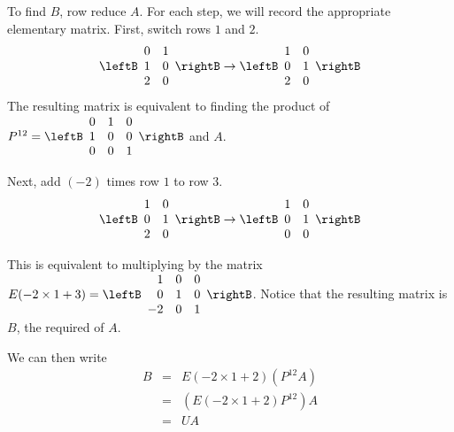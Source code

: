\begin{solution}
To find $B$, row reduce $A$. For each step, we will record the appropriate elementary matrix. 
First, switch rows $1$ and $2$. 
\[
 \leftB
\begin{array}{rr}
0 & 1 \\
1 & 0 \\
2 & 0
\end{array}
\rightB
\rightarrow
\leftB
\begin{array}{rr}
1 & 0 \\
0 & 1 \\
2 & 0
\end{array}
\rightB
\]
The resulting matrix is equivalent to finding the product of 
$ P^{12} =\leftB
\begin{array}{rrr}
0 & 1 & 0 \\
1 & 0 & 0 \\
0 & 0 & 1 
\end{array}
\rightB$ and $A$. 

Next, add $(-2)$ times row $1$ to row $3$. 
\[
\leftB
\begin{array}{rr}
1 & 0 \\
0 & 1 \\
2 & 0
\end{array}
\rightB
\rightarrow
\leftB
\begin{array}{rr}
1 & 0 \\
0 & 1 \\
0 & 0
\end{array}
\rightB
\]

This is equivalent to multiplying by the matrix $E(-2 \times 1 + 3) = 
\leftB
\begin{array}{rrr}
1 & 0 & 0 \\
0 & 1 & 0 \\
-2 & 0 & 1 
\end{array}
\rightB$. Notice that the resulting matrix is $B$, the required \rref\; of $A$.

We can then write 
\begin{eqnarray*}
B &=& E(-2 \times 1 + 2) \left( P^{12} A \right) \\
&=& \left( E(-2 \times 1 + 2) P^{12} \right) A \\
&=& U A
\end{eqnarray*} 


\end{solution}
